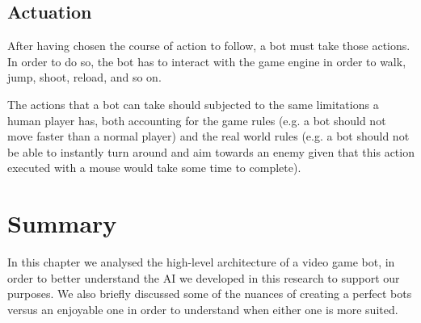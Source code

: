 \subsection{Actuation}
After having chosen the course of action to follow, a bot must take those actions. In order to do so, the bot has to interact with the game engine in order to walk, jump, shoot, reload, and so on.

The actions that a bot can take should subjected to the same limitations a human player has, both accounting for the game rules (e.g. a bot should not move faster than a normal player) and the real world rules (e.g. a bot should not be able to instantly turn around and aim towards an enemy given that this action executed with a mouse would take some time to complete).

\section{Summary}
In this chapter we analysed the high-level architecture of a video game bot, in order to better understand the AI we developed in this research to support our purposes. 
We also briefly discussed some of the nuances of creating a perfect bots versus an enjoyable one in order to understand when either one is more suited.

